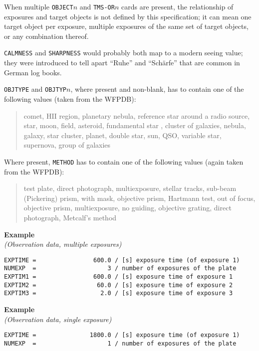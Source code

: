 \documentclass[11pt]{ivoa}
\newcommand\cardname[1]{\texttt{\color{keyword}#1}}
\newenvironment{fitsexample}[1]
{\bigskip\noindent\textbf{Example}\\\textit{(#1\smallskip)}}
{\medskip}
\begin{document}
When multiple \cardname{OBJECT$n$} and \cardname{TMS-OR$n$} cards are
present, the relationship of exposures and target objects is not defined
by this specification; it can mean one target object per exposure,
multiple exposures of the same set of target objects, or any combination
thereof.

\cardname{CALMNESS} and \cardname{SHARPNESS} would probably both map to
a modern seeing value; they were introduced to tell apart ``Ruhe'' and
``Schärfe'' that are common in German log books.

\cardname{OBJTYPE} and \cardname{OBJTYP$n$}, where present and
non-blank, has to contain one of the following values (taken from the
WFPDB):

\begin{quotation}
\noindent comet, HII region, planetary nebula, reference star around a radio
source, star, moon, field, asteroid, fundamental star
, cluster of galaxies, nebula, galaxy, star cluster, planet, double
star, sun, QSO, variable star, supernova, group of galaxies
\end{quotation}

Where present, \cardname{METHOD} has to contain one of the following
values (again taken from the WFPDB):

\begin{quotation}
\noindent test plate, direct photograph, multiexposure, stellar tracks, sub-beam
(Pickering) prism, with mask, objective prism, Hartmann test, out of
focus, objective prism, multiexposure, no guiding, objective grating,
direct photograph, Metcalf's method
\end{quotation}

\begin{fitsexample}{Observation data, multiple exposures}
\begin{lstlisting}
EXPTIME =                600.0 / [s] exposure time (of exposure 1)
NUMEXP  =                    3 / number of exposures of the plate
EXPTIM1 =                600.0 / [s] exposure time of exposure 1
EXPTIM2 =                 60.0 / [s] exposure time of exposure 2
EXPTIM3 =                  2.0 / [s] exposure time of exposure 3
\end{lstlisting}
\end{fitsexample}

\begin{fitsexample}{Observation data, single exposure}
\begin{lstlisting}
EXPTIME =               1800.0 / [s] exposure time (of exposure 1)
NUMEXP  =                    1 / number of exposures of the plate
\end{lstlisting}
\end{fitsexample}
\end{document}
